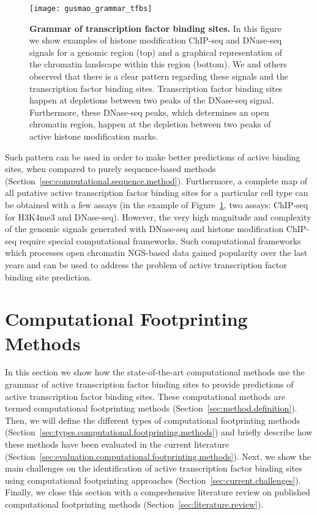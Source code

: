 \begin{figure}[h!]
\centering
\texttt{[image: gusmao\_grammar\_tfbs]}
\caption[Grammar of transcription factor binding sites]{\textbf{Grammar of transcription factor binding sites.} In this figure we show examples of histone modification ChIP-seq and DNase-seq signals for a genomic region (top) and a graphical representation of the chromatin landscape within this region (bottom). We and others observed that there is a clear pattern regarding these signals and the transcription factor binding sites. Transcription factor binding sites happen at depletions between two peaks of the DNase-seq signal. Furthermore, these DNase-seq peaks, which determines an open chromatin region, happen at the depletion between two peaks of active histone modification marks.}
\label{fig:gusmao_grammar_tfbs}
\end{figure}

Such pattern can be used in order to make better predictions of active binding sites, when compared to purely sequence-based methods (Section~\ref{sec:computational.sequence.method}). Furthermore, a complete map of all putative active transcription factor binding sites for a particular cell type can be obtained with a few assays (in the example of Figure~\ref{fig:gusmao_grammar_tfbs}, two assays: ChIP-seq for H3K4me3 and DNase-seq). However, the very high magnitude and complexity of the genomic signals generated with DNase-seq and histone modification ChIP-seq require special computational frameworks. Such computational frameworks which processes open chromatin NGS-based data gained popularity over the last years and can be used to address the problem of active transcription factor binding site prediction.

\section{Computational Footprinting Methods}
\label{sec:computational.footprinting.methods}

In this section we show how the state-of-the-art computational methods use the grammar of active transcription factor binding sites to provide predictions of active transcription factor binding sites. These computational methods are termed computational footprinting methods (Section~\ref{sec:method.definition}). Then, we will define the different types of computational footprinting methods (Section~\ref{sec:types.computational.footprinting.methods}) and briefly describe how these methods have been evaluated in the current literature (Section~\ref{sec:evaluation.computational.footprinting.methods}). Next, we show the main challenges on the identification of active transcription factor binding sites using computational footprinting approaches (Section~\ref{sec:current.challenges}). Finally, we close this section with a comprehensive literature review on published computational footprinting methods (Section~\ref{sec:literature.review}).

